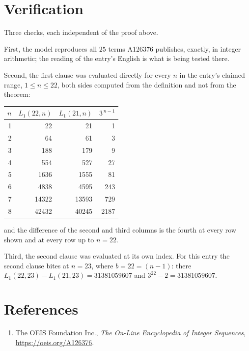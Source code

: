 \documentclass[11pt,a4paper]{article}
\theoremstyle{plain}
\theoremstyle{definition}
\begin{document}
\section{Verification}

Three checks, each independent of the proof above.

First, the model reproduces all $25$ terms A126376 publishes, exactly, in integer
arithmetic; the reading of the entry's English is what is being tested there.

Second, the first clause was evaluated directly for every $n$ in the entry's claimed range,
$1\le n\le22$, both sides computed from the definition and not from the theorem:

\begin{center}
\begin{tabular}{rrrr}
$n$ & $L_{1}(22,n)$ & $L_{1}(21,n)$ & $3^{\,n-1}$ \\ \hline
1 & 22 & 21 & 1 \\
2 & 64 & 61 & 3 \\
3 & 188 & 179 & 9 \\
4 & 554 & 527 & 27 \\
5 & 1636 & 1555 & 81 \\
6 & 4838 & 4595 & 243 \\
7 & 14322 & 13593 & 729 \\
8 & 42432 & 40245 & 2187 \\
\end{tabular}
\end{center}

\noindent and the difference of the second and third columns is the fourth at every row shown
and at every row up to $n=22$.

Third, the second clause was evaluated at its own index. For this entry the second clause bites at $n=23$, where $b=22=(n-1)$: there $L_{1}(22,23)-L_{1}(21,23)=31381059607$ and $3^{22}-2=31381059607$.

\section*{References}
\begin{enumerate}
\item The OEIS Foundation Inc., \emph{The On-Line Encyclopedia of Integer Sequences},
\url{https://oeis.org/A126376}.
\end{enumerate}
\end{document}
